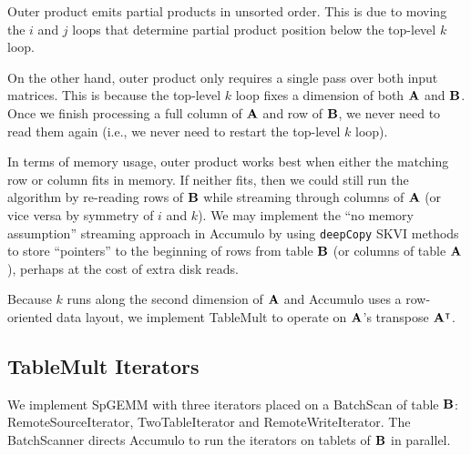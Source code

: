 Outer product emits partial products in unsorted order.
This is due to moving the $i$ and $j$ loops
that determine partial product position
below the top-level $k$ loop.

On the other hand, outer product only requires a single pass over both input matrices.
This is because the top-level $k$ loop fixes a dimension of both $\mathbf{A}$ and $\mathbf{B}$.
Once we finish processing a full column of $\mathbf{A}$ and row of $\mathbf{B}$,
we never need to read them again (i.e., we never need to restart the top-level $k$ loop).

In terms of memory usage, outer product works best when either the matching row or column fits in memory.
If neither fits, then we could still run the algorithm by
re-reading rows of $\mathbf{B}$ while streaming through columns of $\mathbf{A}$ 
(or vice versa by symmetry of $i$ and $k$).
We may implement the ``no memory assumption'' streaming approach in Accumulo by using
\texttt{deepCopy} SKVI methods to store ``pointers'' to the beginning of rows from table $\mathbf{B}$
(or columns of table $\mathbf{A}$),
perhaps at the cost of extra disk reads.

Because $k$ runs along the second dimension of $\mathbf{A}$
and Accumulo uses a row-oriented data layout, we implement 
TableMult to operate on $\mathbf{A}$'s transpose $\mathbf{A^{\intercal}}$.



\subsection{TableMult Iterators}
\label{sTableMult}

We implement SpGEMM with three iterators placed on a BatchScan of table $\mathbf{B}$:
RemoteSourceIterator, TwoTableIterator and RemoteWriteIterator.
The BatchScanner directs Accumulo to run the iterators on tablets of $\mathbf{B}$ in parallel.

